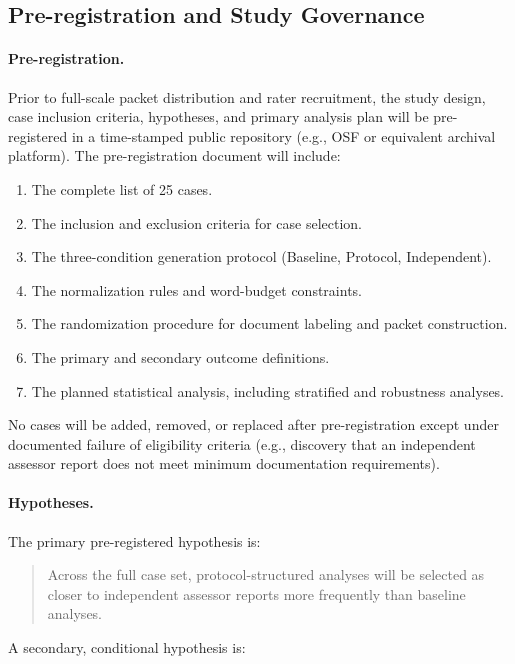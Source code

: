 \subsection{Pre-registration and Study Governance}
\label{sec:prereg}

\paragraph{Pre-registration.}
Prior to full-scale packet distribution and rater recruitment, the study design, case inclusion criteria, hypotheses, and primary analysis plan will be pre-registered in a time-stamped public repository (e.g., OSF or equivalent archival platform). The pre-registration document will include:

\begin{enumerate}
    \item The complete list of 25 cases.
    \item The inclusion and exclusion criteria for case selection.
    \item The three-condition generation protocol (Baseline, Protocol, Independent).
    \item The normalization rules and word-budget constraints.
    \item The randomization procedure for document labeling and packet construction.
    \item The primary and secondary outcome definitions.
    \item The planned statistical analysis, including stratified and robustness analyses.
\end{enumerate}

No cases will be added, removed, or replaced after pre-registration except under documented failure of eligibility criteria (e.g., discovery that an independent assessor report does not meet minimum documentation requirements).

\paragraph{Hypotheses.}
The primary pre-registered hypothesis is:

\begin{quote}
Across the full case set, protocol-structured analyses will be selected as closer to independent assessor reports more frequently than baseline analyses.
\end{quote}

A secondary, conditional hypothesis is:

